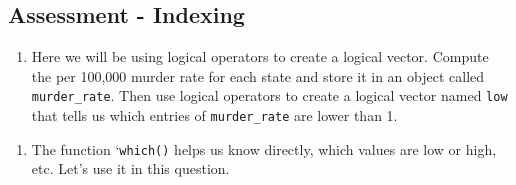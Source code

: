 \documentclass[
]{article}
\newenvironment{Shaded}{\begin{snugshade}}{\end{snugshade}}
\newcommand{\CommentTok}[1]{\textcolor[rgb]{0.56,0.35,0.01}{\textit{#1}}}
\newcommand{\DecValTok}[1]{\textcolor[rgb]{0.00,0.00,0.81}{#1}}
\newcommand{\KeywordTok}[1]{\textcolor[rgb]{0.13,0.29,0.53}{\textbf{#1}}}
\newcommand{\NormalTok}[1]{#1}
\newcommand{\OperatorTok}[1]{\textcolor[rgb]{0.81,0.36,0.00}{\textbf{#1}}}
\newcommand{\StringTok}[1]{\textcolor[rgb]{0.31,0.60,0.02}{#1}}
\providecommand{\tightlist}{%
  \setlength{\itemsep}{0pt}\setlength{\parskip}{0pt}}
\begin{document}
\hypertarget{assessment---indexing}{%
\subsection{Assessment - Indexing}\label{assessment---indexing}}

\begin{enumerate}
\def\labelenumi{\arabic{enumi}.}
\tightlist
\item
  Here we will be using logical operators to create a logical vector.
  Compute the per 100,000 murder rate for each state and store it in an
  object called \texttt{murder\_rate}. Then use logical operators to
  create a logical vector named \texttt{low} that tells us which entries
  of \texttt{murder\_rate} are lower than 1.
\end{enumerate}

\begin{Shaded}
\end{Shaded}

\begin{enumerate}
\def\labelenumi{\arabic{enumi}.}
\setcounter{enumi}{1}
\tightlist
\item
  The function `\texttt{which()} helps us know directly, which values
  are low or high, etc. Let's use it in this question.
\end{enumerate}

\begin{Shaded}
\end{Shaded}
\end{document}
